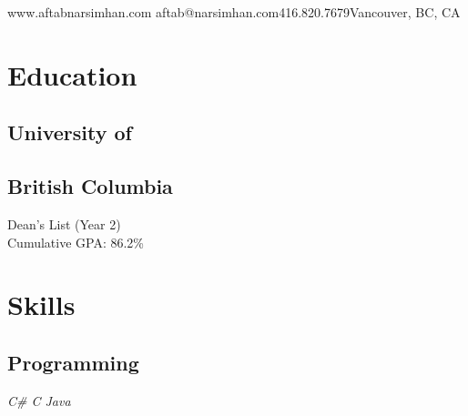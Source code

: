 \documentclass[]{aftab-resume}
\begin{document}
       {www.aftabnarsimhan.com}
       {aftab@narsimhan.com}{416.820.7679}{Vancouver, BC, CA}
       

%
%

\begin{minipage}[t]{0.33\textwidth} 


\section{Education}
\vspace{0.15cm}

\subsection{University of}
\subsection{British Columbia}
\vspace{0.05cm}
\vspace{0.05cm}
\vspace{0.05cm}
\textbullet{} Dean's List (Year 2) \\
\textbullet{} Cumulative GPA: 86.2\%
\vspace{0.075cm}

\vspace{0.825cm}


\section{Skills}
\vspace{0.15cm}

\subsection{Programming}
\vspace{0.01cm}

\it{\textbullet{} C\# \textbullet{} C \textbullet{} Java \\ }
\vspace{0.05cm}


\end{minipage}
\end{document}

